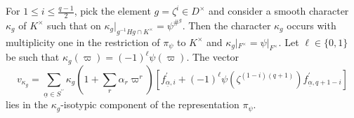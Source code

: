 \documentclass[10pt,a4paper]{amsart}
\begin{document}
\begin{proposition}\label{prop2}
For $1 \leq i \leq \frac{q-1}{2}$, pick the element $g=\zeta^i \in D^\times$ and consider a smooth character $\kappa_g$ of $K^\times$ such that on $\kappa_g|_{g^{-1}Hg \cap K^\times} = \psi^{{\#}^g}$. Then the character $\kappa_g$ occurs with multiplicity one in the restriction of $\pi_\psi$ to $K^\times$ and $\kappa_g|_{F^\times} = \psi|_{F^\times}$. Let $\ell \in \{0,1\}$ be such that $\kappa_g(\varpi) = (-1)^\ell \psi(\varpi)$. The vector
\[v_{\kappa_g} = \sum\limits_{\underline{\alpha} \in S^{\prime \prime} } \kappa_g(1 + \sum\limits_{r} \alpha_r \varpi^r) \left[ f_{\underline{\alpha}, i}^\prime + (-1)^\ell \psi(\zeta^{(1-i)(q+1)})  f_{\underline{\alpha}, q+1-i}^\prime \right]\] 
lies in the $\kappa_g$-isotypic component of the representation $\pi_\psi$.
\end{proposition}
\end{document}
